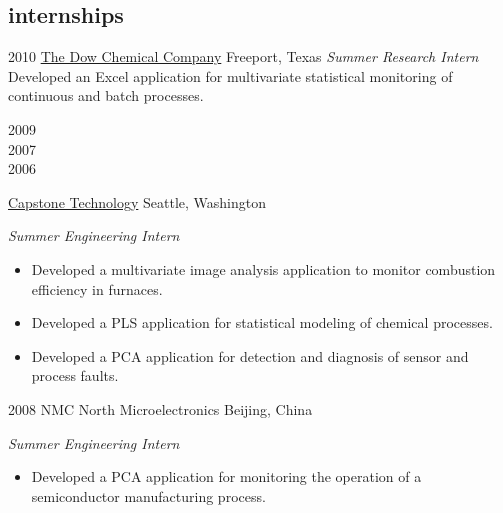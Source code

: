 \documentclass[]{friggeri-cv} %
\begin{document}

\subsection{internships}

\begin{entrylist}

\entry
{2010}
{\href{http://www.dow.com/}{The Dow Chemical Company}}
{Freeport, Texas}
{\emph{Summer Research Intern} \\
Developed an Excel application for multivariate statistical monitoring of continuous and batch processes.}


\entry
{\begin{minipage}[t]{2cm}2009 \\ 2007 \\ 2006\end{minipage}}
{\href{http://www.capstonetechnology.com}{Capstone Technology}}
{Seattle, Washington}
{\emph{Summer Engineering Intern}
\begin{itemize}
	\item Developed a multivariate image analysis application to monitor combustion efficiency in furnaces.
	\item Developed a PLS application for statistical modeling of chemical processes.
	\item Developed a PCA application for detection and diagnosis of sensor and process faults.
\end{itemize}}


\entry
{2008}
{NMC North Microelectronics}
{Beijing, China}
{\emph{Summer Engineering Intern}
\begin{itemize}
	\item Developed a PCA application for monitoring the operation of a semiconductor manufacturing process.
\end{itemize}}





\end{entrylist}

\end{document}
